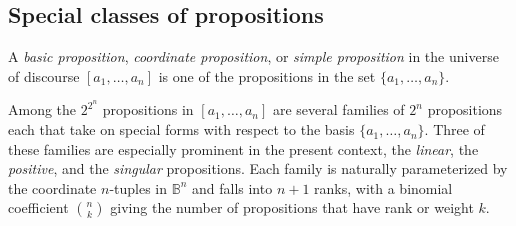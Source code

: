\documentclass[12pt]{article}
\begin{document}
\subsection{Special classes of propositions}

A \textit{basic proposition}, \textit{coordinate proposition}, or \textit{simple proposition} in the universe of discourse $[a_1, \ldots, a_n]$ is one of the propositions in the set $\{ a_1, \ldots, a_n \}.$

Among the $2^{2^n}$ propositions in $[a_1, \ldots, a_n]$ are several families of $2^n$ propositions each that take on special forms with respect to the basis $\{ a_1, \ldots, a_n \}.$  Three of these families are especially prominent in the present context, the \textit{linear}, the \textit{positive}, and the \textit{singular} propositions.  Each family is naturally parameterized by the coordinate $n$-tuples in $\mathbb{B}^n$ and falls into $n + 1$ ranks, with a binomial coefficient $\binom{n}{k}$ giving the number of propositions that have rank or weight $k.$
\end{document}
